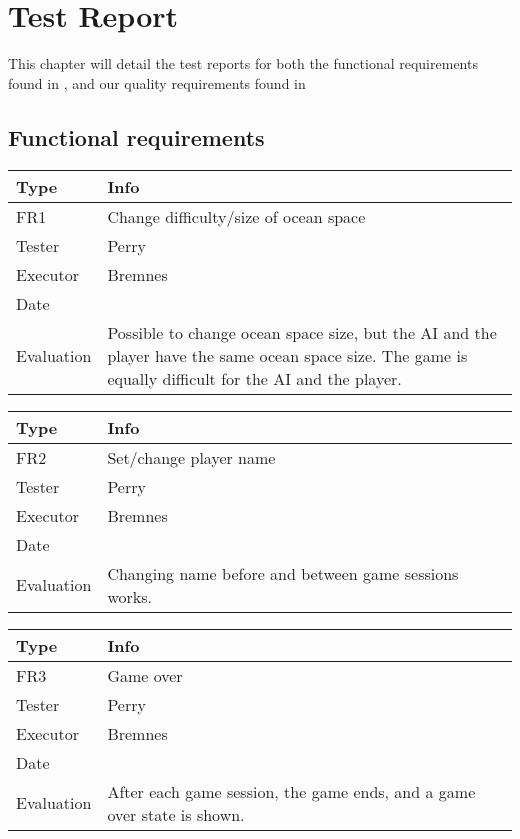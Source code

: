 \chapter{Test Report}
\label{cha:test_report}


This chapter will detail the test reports for both the functional requirements found in %
, and our quality requirements found in %


\section{Functional requirements}

\begin{tabular}{|p{2cm}|p{9.5cm}|}
	\hline
	\bf{Type}	& \bf{Info} \\
	\hline
	FR1			& Change difficulty/size of ocean space \\
	Tester		& Perry \\
	Executor	& Bremnes \\
	Date		& \date{\today} \\
	Evaluation	& Possible to change ocean space size, but the AI and the player have the same ocean space size. The game is equally difficult for the AI and the player. \\
	\hline
\end{tabular}

\vspace{0.5em}

\noindent
\begin{tabular}{|p{2cm}|p{9.5cm}|}
	\hline
	\bf{Type}	& \bf{Info} \\
	\hline
	FR2			& Set/change player name \\
	Tester		& Perry \\
	Executor	& Bremnes \\
	Date		& \date{\today} \\
	Evaluation	& Changing name before and between game sessions works. \\
	\hline
\end{tabular}

\vspace{0.5em}

\noindent
\begin{tabular}{|p{2cm}|p{9.5cm}|}
	\hline
	\bf{Type}	& \bf{Info} \\
	\hline
	FR3			& Game over \\
	Tester		& Perry \\
	Executor	& Bremnes \\
	Date		& \date{\today} \\
	Evaluation	& After each game session, the game ends, and a game over state is shown. \\
	\hline
\end{tabular}

